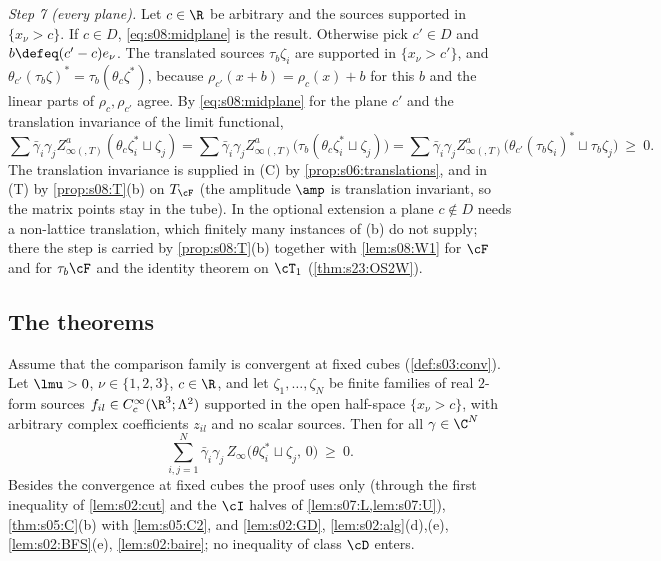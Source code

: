 \emph{Step 7 (every plane).} Let $c\in\R$ be arbitrary and the sources supported in $\{x_\nu>c\}$. If $c\in D$, \eqref{eq:s08:midplane} is the result. Otherwise pick $c'\in D$ and $b\defeq(c'-c)e_\nu$. The translated sources $\tau_b\zeta_i$ are supported in $\{x_\nu>c'\}$, and $\theta_{c'}(\tau_b\zeta)^*=\tau_b(\theta_c\zeta^*)$, because $\rho_{c'}(x+b)=\rho_c(x)+b$ for this $b$ and the linear parts of $\rho_c,\rho_{c'}$ agree. By \eqref{eq:s08:midplane} for the plane $c'$ and the translation invariance of the limit functional,
\[
\sum\bar\gamma_i\gamma_jZ^a_{\infty(,T)}(\theta_c\zeta_i^*\sqcup\zeta_j)=\sum\bar\gamma_i\gamma_jZ^a_{\infty(,T)}\big(\tau_b(\theta_c\zeta_i^*\sqcup\zeta_j)\big)=\sum\bar\gamma_i\gamma_jZ^a_{\infty(,T)}\big(\theta_{c'}(\tau_b\zeta_i)^*\sqcup\tau_b\zeta_j\big)\ \ge\ 0 .
\]
The translation invariance is supplied in (C) by \cref{prop:s06:translations}, and in (T) by \cref{prop:s08:T}(b) on $T_\cF$ (the amplitude $\amp$ is translation invariant, so the matrix points stay in the tube). In the optional extension a plane $c\notin D$ needs a non-lattice translation, which finitely many instances of \Wtwo(b) do not supply; there the step is carried by \cref{prop:s08:T}(b) together with \cref{lem:s08:W1} for $\cF$ and for $\tau_b\cF$ and the identity theorem on $\cT_1$ (\cref{thm:s23:OS2W}).

\subsection{The theorems}

\begin{theorem}\label{thm:s08:OS2C}
Assume that the comparison family is convergent at fixed cubes (\cref{def:s03:conv}). Let $\lmu>0$, $\nu\in\{1,2,3\}$, $c\in\R$, and let $\zeta_1,\dots,\zeta_N$ be finite families of real $2$-form sources $f_{il}\in C^\infty_c(\R^3;\Lambda^2)$ supported in the open half-space $\{x_\nu>c\}$, with arbitrary complex coefficients $z_{il}$ and no scalar sources. Then for all $\gamma\in\C^N$
\[
\sum_{i,j=1}^N\bar\gamma_i\gamma_j\,Z_\infty\big(\theta\zeta_i^*\sqcup\zeta_j,\,0\big)\ \ge\ 0 .
\]
Besides the convergence at fixed cubes the proof uses only \cite[Thm.~6.2(1),(2)]{BFS1} (through the first inequality of \cref{lem:s02:cut} and the $\cI$ halves of \cref{lem:s07:L,lem:s07:U}), \cref{thm:s05:C}(b) with \cref{lem:s05:C2}, and \cref{lem:s02:GD}, \cref{lem:s02:alg}(d),(e), \cref{lem:s02:BFS}(e), \cref{lem:s02:baire}; no inequality of class $\cD$ enters.
\end{theorem}

